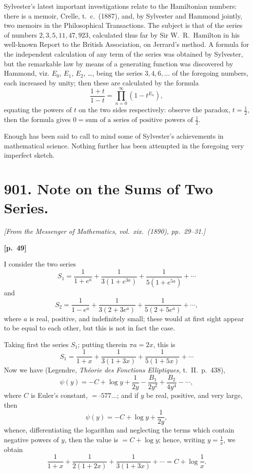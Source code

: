 \documentclass[11pt,a4paper]{book}
\begin{document}
Sylvester's latest important investigations relate to the Hamiltonian numbers: there is a memoir, Crelle, t.\ c.\ (1887), and, by Sylvester and Hammond jointly, two memoirs in the Philosophical Transactions. The subject is that of the series of numbers $2, 3, 5, 11, 47, 923$, calculated thus far by Sir W.\ R.\ Hamilton in his well-known Report to the British Association, on Jerrard's method. A formula for the independent calculation of any term of the series was obtained by Sylvester, but the remarkable law by means of a generating function was discovered by Hammond, viz. $E_0$, $E_1$, $E_2$, \ldots, being the series $3, 4, 6, \ldots$ of the foregoing numbers, each increased by unity; then these are calculated by the formula
$$
\frac{1 + t}{1 - t} = \prod_{n=0}^{\infty} (1 - t^{E_n}),
$$
equating the powers of $t$ on the two sides respectively: observe the paradox, $t = \frac{1}{2}$, then the formula gives $0 = \text{sum of a series of positive powers of } \frac{1}{2}$.

Enough has been said to call to mind some of Sylvester's achievements in mathematical science. Nothing further has been attempted in the foregoing very imperfect sketch.

\newpage

\section*{901. Note on the Sums of Two Series.}

\noindent\textit{[From the Messenger of Mathematics, vol.\ xix.\ (1890), pp.\ 29--31.]}

\vspace{0.5em}
\noindent\textbf{[p.\ 49]}

I consider the two series
$$
S_1 = \frac{1}{1 + e^a} + \frac{1}{3(1 + e^{3a})} + \frac{1}{5(1 + e^{5a})} + \cdots
$$
and
$$
S_2 = \frac{1}{1 - e^a} + \frac{1}{3(2 + 3e^a)} + \frac{1}{5(2 + 5e^a)} + \cdots,
$$
where $a$ is real, positive, and indefinitely small; these would at first sight appear to be equal to each other, but this is not in fact the case.

Taking first the series $S_1$; putting therein $\pi a = 2x$, this is
$$
S_1 = \frac{1}{1 + x} + \frac{1}{3(1 + 3x)} + \frac{1}{5(1 + 5x)} + \cdots
$$
Now we have (Legendre, \textit{Th\'eorie des Fonctions Elliptiques}, t.\ II.\ p.\ 438),
$$
\psi(y) = -C + \log y + \frac{1}{2y} - \frac{B_1}{2y^2} + \frac{B_2}{4y^4} - \cdots,
$$
where $C$ is Euler's constant, $= \cdot 577\ldots$; and if $y$ be real, positive, and very large, then
$$
\psi(y) = -C + \log y + \frac{1}{2y},
$$
whence, differentiating the logarithm and neglecting the terms which contain negative powers of $y$, then the value is $= C + \log y$; hence, writing $y = \frac{1}{x}$, we obtain
$$
\frac{1}{1 + x} + \frac{1}{2(1 + 2x)} + \frac{1}{3(1 + 3x)} + \cdots = C + \log\frac{1}{x}.
$$
\end{document}

